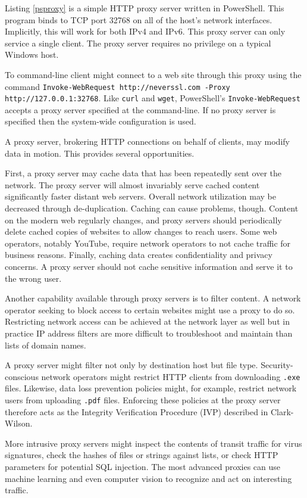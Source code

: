 \documentclass{book}
\begin{document}
Listing \ref{psproxy} is a simple HTTP proxy server written in PowerShell. This program binds to TCP port 32768 on all of the host's network interfaces. Implicitly, this will work for both IPv4 and IPv6. This proxy server can only service a single client. The proxy server requires no privilege on a typical Windows host.

To command-line client might connect to a web site through this proxy using the command \texttt{Invoke-WebRequest http://neverssl.com -Proxy http://127.0.0.1:32768}. Like \texttt{curl} and \texttt{wget}, PowerShell's \texttt{Invoke-WebRequest} accepts a proxy server specified at the command-line. If no proxy server is specified then the system-wide configuration is used.

A proxy server, brokering HTTP connections on behalf of clients, may modify data in motion. This provides several opportunities.

First, a proxy server may cache data that has been repeatedly sent over the network. The proxy server will almost invariably serve cached content significantly faster distant web servers. Overall network utilization may be decreased through de-duplication. Caching can cause problems, though. Content on the modern web regularly changes, and proxy servers should periodically delete cached copies of websites to allow changes to reach users. Some web operators, notably YouTube, require network operators to not cache traffic for business reasons. Finally, caching data creates confidentiality and privacy concerns. A proxy server should not cache sensitive information and serve it to the wrong user.

Another capability available through proxy servers is to filter content. A network operator seeking to block access to certain websites might use a proxy to do so. Restricting network access can be achieved at the network layer as well but in practice IP address filters are more difficult to troubleshoot and maintain than lists of domain names.

A proxy server might filter not only by destination host but file type. Security-conscious network operators might restrict HTTP clients from downloading \texttt{.exe} files. Likewise, data loss prevention policies might, for example, restrict network users from uploading \texttt{.pdf} files. Enforcing these policies at the proxy server therefore acts as the Integrity Verification Procedure (IVP) described in Clark-Wilson.

More intrusive proxy servers might inspect the contents of transit traffic for virus signatures, check the hashes of files or strings against lists, or check HTTP parameters for potential SQL injection. The most advanced proxies can use machine learning and even computer vision to recognize and act on interesting traffic.
\end{document}
